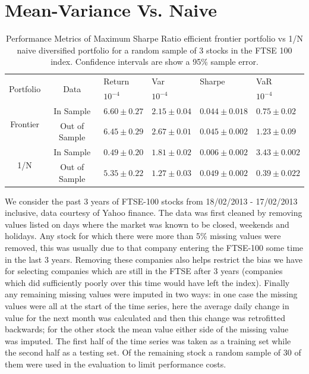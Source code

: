 \documentclass[a4paper,10pt, twocolumn]{article}
\begin{document}
\section{Mean-Variance Vs. Naive}
\begin{table}[t]
\begin{tabular}{|c|c|l|l|l|l|}
  \hline
  \multirow{ 2}{*}{Portfolio} & \multirow{ 2}{*}{Data} & Return & Var & Sharpe & VaR\\
   & & $10^{-4}$ & $10^{-4}$ & & $10^{-4}$ \\
  \hline 
  \multirow{ 2}{*}{Frontier} & In Sample & $6.60 \pm 0.27$ & $2.15 \pm 0.04$ & $0.044 \pm 0.018$ & $0.75 \pm 0.02$ \\
  & Out of Sample & $6.45 \pm 0.29$ & $2.67 \pm 0.01$ & $0.045 \pm 0.002$ & $1.23 \pm 0.09$\\ 
  \hline  
  \multirow{ 2}{*}{1/N} & In Sample & $0.49 \pm 0.20$ & $1.81\pm0.02$ & $0.006\pm0.002$ & $3.43\pm0.002$ \\
  & Out of Sample & $5.35\pm0.22$ & $1.27\pm0.03$ & $0.049\pm0.002$ & $0.39\pm0.022$ \\
  \hline 
\end{tabular}
\caption{Performance Metrics of Maximum Sharpe Ratio efficient frontier portfolio vs 1/N naive diversified portfolio for a random sample of 3 stocks in the FTSE 100 index. Confidence intervals are show a 95\% sample error.}
\end{table}

We consider the past 3 years of FTSE-100 stocks from 18/02/2013 - 17/02/2013 inclusive, data courtesy of Yahoo finance. The data was first cleaned by removing values listed on days where the market was known to be closed, weekends and holidays. Any stock for which there were more than 5\% missing values were removed, this was usually due to that company entering the FTSE-100 some time in the last 3 years. Removing these companies also helps restrict the bias we have for selecting companies which are still in the FTSE after 3 years (companies which did sufficiently poorly over this time would have left the index). Finally any remaining missing values were imputed in two ways: in one case the missing values were all at the start of the time series, here the average daily change in value for the next month was calculated and then this change was retrofitted backwards; for the other stock the mean value either side of the missing value was imputed. The first half of the time series was taken as a training set while the second half as a testing set. Of the remaining stock a random sample of 30 of them were used in the evaluation to limit performance costs. 
\end{document}
